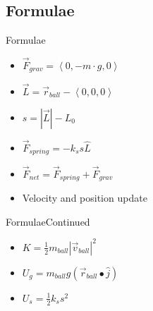 \subsection{Formulae}
\begin{frame}{Formulae}
    \begin{itemize}
    \item \(\displaystyle\vec{F}_{grav} = \left\langle0,-m\cdot g,0\right\rangle \)
    \item \(\displaystyle \vec{L} = \vec{r}_{ball} - \left\langle0,0,0\right\rangle \)
    \item \(\displaystyle s = |\vec{L}| - L_0 \)
    \item \(\displaystyle \vec{F}_{spring} = -k_s s \hat{L}\)
    \item \(\displaystyle \vec{F}_{net} = \vec{F}_{spring} + \vec{F}_{grav} \)
    \item Velocity and position update
    \end{itemize}
\end{frame}

\begin{frame}{Formulae}{Continued}
    \begin{itemize}
    \item \(\displaystyle K = \frac{1}{2} m_{ball} |\vec{v}_{ball}|^2 \)
    \item \(\displaystyle U_g = m_{ball} g \left(\vec{r}_{ball}\bullet \hat{j}\right) \)
    \item \(\displaystyle U_s = \frac{1}{2} k_s s^2 \)
    \end{itemize}
\end{frame}